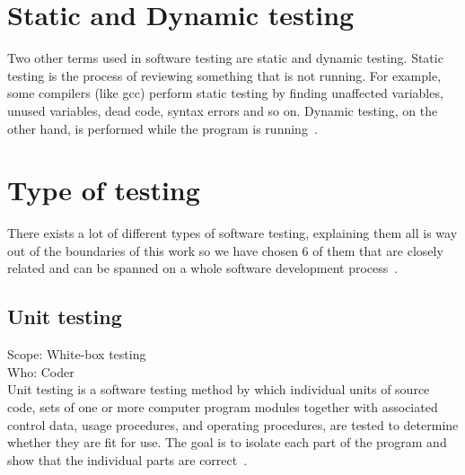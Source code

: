 \documentclass[12pt]{article}
\theoremstyle{definition}
\theoremstyle{definition}
\theoremstyle{remark}
\begin{document}

\section{Static and Dynamic testing}


Two other terms used in software testing are static and dynamic testing. Static testing is the process of reviewing something that is not running. For example, some compilers (like gcc) perform static testing by finding unaffected variables, unused variables, dead code, syntax errors and so on. Dynamic testing, on the other hand, is performed while the program is running~\cite{StaticDynamicTesting:2018}.



\section{Type of testing}


There exists a lot of different types of software testing, explaining them all is way out of the boundaries of this work so we have chosen 6 of them that are closely related and can be spanned on a whole software development process~\cite{Laurie.W:Black-box}.


\subsection{Unit testing}

Scope: White-box testing\\
Who: Coder\\

Unit testing is a software testing method by which individual units of source code, sets of one or more computer program modules together with associated control data, usage procedures, and operating procedures, are tested to determine whether they are fit for use. The goal is to isolate each part of the program and show that the individual parts are correct~\cite{AutomatedDefectPrevention:2007}.\\
\end{document}
